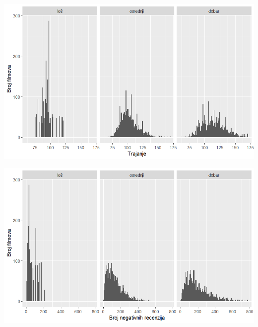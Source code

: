 \begin{center}
	\includegraphics[width=15cm]{../figures/expl/007.png}
\end{center}

\begin{center}
	\includegraphics[width=15cm]{../figures/expl/008.png}
\end{center}


\eject